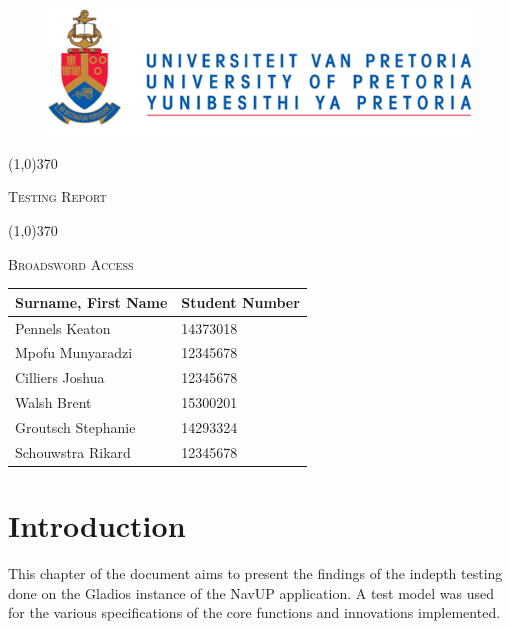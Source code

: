 \documentclass[english]{article}
\begin{document}
	
	\begin{figure}
		\includegraphics[width=\linewidth]{up_logo.png}
	\end{figure}
	
	\begin{center}
	 \line(1,0){370}
	\\[0.2cm]
    {\scshape\Large Testing Report  \par}
	\vspace{0.1cm}
	\line(1,0){370}
	\\[0.8cm]
	
	 {\scshape\Large Broadsword Access \par}
	\vspace{0.9cm}
	
	\begin{tabu} to \textwidth { X[l] X[l]}
		\hline
		\textbf{Surname, First Name  }	& \textbf{Student Number}	\\ \hline \hline
		Pennels 	Keaton   &14373018	\\ \hline
		Mpofu	Munyaradzi   &12345678		\\ \hline
		Cilliers	Joshua   &12345678		\\ \hline
		Walsh     Brent    &15300201		\\ \hline
		Groutsch	Stephanie    &14293324		\\ \hline
		Schouwstra	Rikard    &12345678		\\ \hline
		\hline
	\end{tabu}
	
	\end{center}
	
	
	\newpage
	\tableofcontents

	\newpage
	
	\section{Introduction}

				This chapter of the document aims to present the findings of the indepth testing done on the Gladios instance of the NavUP application. A test model was used for the various specifications of the core functions and innovations implemented.
\end{document}
